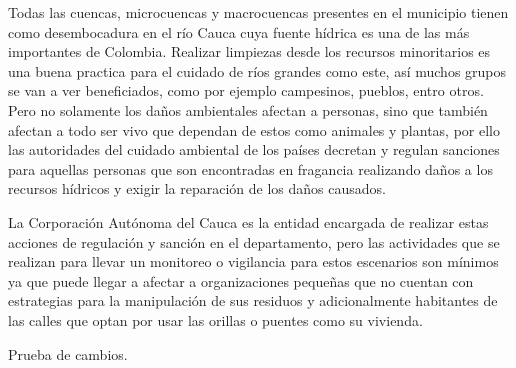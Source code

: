   Todas las cuencas, microcuencas y macrocuencas presentes en el municipio tienen como desembocadura en el río Cauca cuya fuente hídrica es una de las más importantes de Colombia. Realizar limpiezas desde los recursos minoritarios es una buena practica para el cuidado de ríos grandes como este, así muchos grupos se van a ver beneficiados, como por ejemplo campesinos, pueblos, entro otros. Pero no solamente los daños ambientales afectan a personas, sino que también afectan a todo ser vivo que dependan de estos como animales y plantas, por ello las autoridades del cuidado ambiental de los países decretan y regulan sanciones para aquellas personas que son encontradas en fragancia realizando daños a los recursos hídricos y exigir la reparación de los daños causados.

  La Corporación Autónoma del Cauca es la entidad encargada de realizar estas acciones de regulación y sanción en el departamento, pero las actividades que se realizan para llevar un monitoreo o vigilancia para estos escenarios son mínimos ya que puede llegar a afectar a organizaciones pequeñas que no cuentan con estrategias para la manipulación de sus residuos y adicionalmente habitantes de las calles que optan por usar las orillas o puentes como su vivienda.

  Prueba de cambios.
